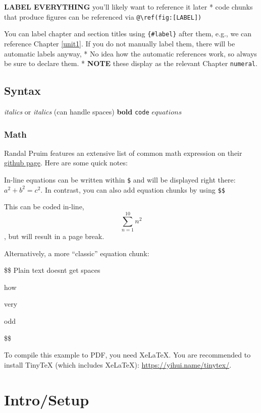 \documentclass[
]{book}
\begin{document}
\textbf{LABEL EVERYTHING} you'll likely want to reference it later
* code chunks that produce figures can be referenced via \texttt{@\textbackslash{}ref(fig:{[}LABEL{]})}

You can label chapter and section titles using \texttt{\{\#label\}} after them, e.g., we can reference Chapter \ref{unit1}. If you do not manually label them, there will be automatic labels anyway,
* No idea how the automatic references work, so always be sure to declare them.
* \textbf{NOTE} these display as the relevant Chapter \texttt{numeral}.

\hypertarget{syntax}{%
\section{Syntax}\label{syntax}}

\emph{italics} or
\emph{italics} (can handle spaces)
\textbf{bold}
\texttt{code}
\(equations\)

\hypertarget{math}{%
\subsection{Math}\label{math}}

Randal Pruim features an extensive list of common math expression on their \href{https://rpruim.github.io/s341/S19/from-class/MathinRmd.html}{github page}. Here are some quick notes:

In-line equations can be written within \texttt{\$} and will be displayed right there: \(a^2 + b^2 = c^2\). In contrast, you can also add equation chunks by using \texttt{\$\$}

This can be coded in-line, \[\sum_{n=1}^{10} n^2\], but will result in a page break.

Alternatively, a more ``classic'' equation chunk:

\$\$
Plain text doesnt get spaces

how

very

odd

\$\$

To compile this example to PDF, you need XeLaTeX. You are recommended to install TinyTeX (which includes XeLaTeX): \url{https://yihui.name/tinytex/}.

\hypertarget{introsetup-2}{%
\chapter{Intro/Setup}\label{introsetup-2}}
\end{document}
